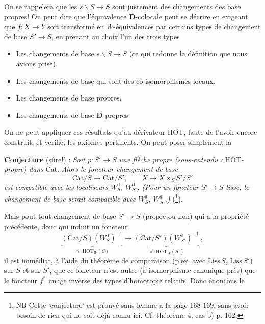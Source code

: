 \documentclass[11pt]{article}
\newcommand{\printedpage}[1]{\marginpar{\footnotesize p.~#1}}
\newcommand{\msp}[1]{\marginpar{\footnotesize [#1]}}
\newcommand{\HOT}{\mathrm{HOT}}
\newcommand{\Cat}{\mathrm{Cat}}
\newcommand{\und}[1]{\underline{\mathrm{#1}}}
\begin{document}
On se rappelera que les $s\backslash S \longrightarrow S$ sont justement des changements des base propres! On %
peut dire que l'équivalence $\mathbf{D}$-colocale peut se décrire en exigeant que $f : X \longrightarrow Y$ soit transformé en $W$-équivalences par certains types de changement de base $S' \longrightarrow S$, en prenant au choix l'un des trois types

\begin{itemize}
\item[a)] Les changements de base $s\backslash S \longrightarrow S$ (ce qui redonne la définition que nous avions prise).
\item[b)] Les changements de base qui sont des co-isomorphismes locaux.
\item[c)] Les changements de base propres.
\item[d)] Les changements de base $\mathbf{D}$-propres.
\end{itemize}

On ne peut appliquer ces résultats qu'au dérivateur
\msp{page 122}
HOT, faute de l'avoir encore construit, et verifié, les axiomes pertinents. On peut poser %
simplement la

\textbf{Conjecture} (sûre!) : \textit{Soit $p : S' \longrightarrow S$ une flèche propre (sous-entendu :} HOT\textit{-propre) dans} Cat. \textit{Alors le foncteur changement de base}
\[
\Cat/S \longrightarrow \Cat/S', \qquad X \longmapsto X \times_S S'/S'
\]
\textit{est compatible avec les localiseurs $W_S^{\mathrm{d}}$, $W_{S'}^{\mathrm{d}}$. (Pour un foncteur $S' \longrightarrow S$ lisse, le changement de base serait compatible avec $W_S^{\mathrm{g}}$, $W_{S'}^{\mathrm{g}}$.)} (\footnote[61]{NB Cette `conjecture' est prouvé sans lemme à la page 168-169, sans avoir besoin de rien qui ne soit %
déjà connu ici. Cf. théorème 4, cas b) p. 162.}).

Mais pout tout changement de base $S' \longrightarrow S$ (propre ou non) qui a la propriété précédente, %
donc qui induit un foncteur
\[
\underbrace{(\Cat/S)(W_S^{\mathrm{d}})^{-1}}_{\approx\,\HOT_W(S)} \longrightarrow \underbrace{(\Cat/S')(W_{S'}^{\mathrm{d}})^{-1}}_{\approx\,\HOT_W(S')}\ ,
\]
\printedpage{76}
il est immédiat, à l'aide du théorème de comparaison (p.ex. avec $\und{Liss}\,S$, $\und{Liss}\,S'$) sur $S$ et sur $S'$, que ce foncteur n'est autre (à isomorphisme canonique près) que le foncteur $f^*$ image inverse des types d'homotopie relatifs. Donc énoncons le %
\end{document}
